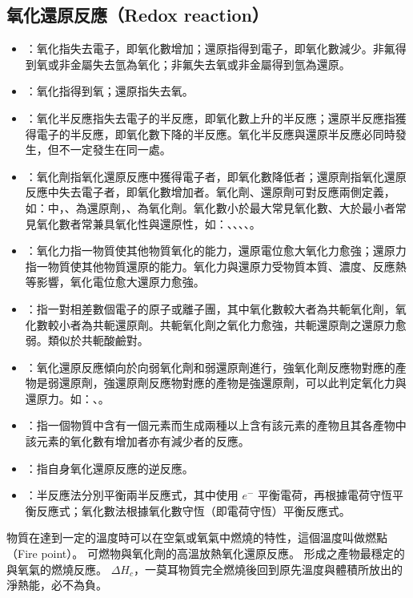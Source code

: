 \documentclass[a4paper,12pt]{article}
\begin{document}
\subsection{氧化還原反應（Redox reaction）}
\begin{itemize}
\item {}：氧化指失去電子，即氧化數增加；還原指得到電子，即氧化數減少。非氟得到氧或非金屬失去氫為氧化；非氟失去氧或非金屬得到氫為還原。
\item {}：氧化指得到氧；還原指失去氧。
\item {}：氧化半反應指失去電子的半反應，即氧化數上升的半反應；還原半反應指獲得電子的半反應，即氧化數下降的半反應。氧化半反應與還原半反應必同時發生，但不一定發生在同一處。
\item {}：氧化劑指氧化還原反應中獲得電子者，即氧化數降低者；還原劑指氧化還原反應中失去電子者，即氧化數增加者。氧化劑、還原劑可對反應兩側定義，如：中，、為還原劑，、為氧化劑。氧化數小於最大常見氧化數、大於最小者常見氧化數者常兼具氧化性與還原性，如：、、、、。
\item {}：氧化力指一物質使其他物質氧化的能力，還原電位愈大氧化力愈強；還原力指一物質使其他物質還原的能力。氧化力與還原力受物質本質、濃度、反應熱等影響，氧化電位愈大還原力愈強。
\item {}：指一對相差數個電子的原子或離子團，其中氧化數較大者為共軛氧化劑，氧化數較小者為共軛還原劑。共軛氧化劑之氧化力愈強，共軛還原劑之還原力愈弱。類似於共軛酸鹼對。
\item {}：氧化還原反應傾向於向弱氧化劑和弱還原劑進行，強氧化劑反應物對應的產物是弱還原劑，強還原劑反應物對應的產物是強還原劑，可以此判定氧化力與還原力。如：、。
\item {}：指一個物質中含有一個元素而生成兩種以上含有該元素的產物且其各產物中該元素的氧化數有增加者亦有減少者的反應。
\item {}：指自身氧化還原反應的逆反應。
\item {}：半反應法分別平衡兩半反應式，其中使用 $e^-$ 平衡電荷，再根據電荷守恆平衡反應式；氧化數法根據氧化數守恆（即電荷守恆）平衡反應式。
\end{itemize}
物質在達到一定的溫度時可以在空氣或氧氣中燃燒的特性，這個溫度叫做燃點（Fire point）。
可燃物與氧化劑的高溫放熱氧化還原反應。
形成之產物最穩定的與氧氣的燃燒反應。
$\Delta H_c$，一莫耳物質完全燃燒後回到原先溫度與體積所放出的淨熱能，必不為負。
\end{document}
